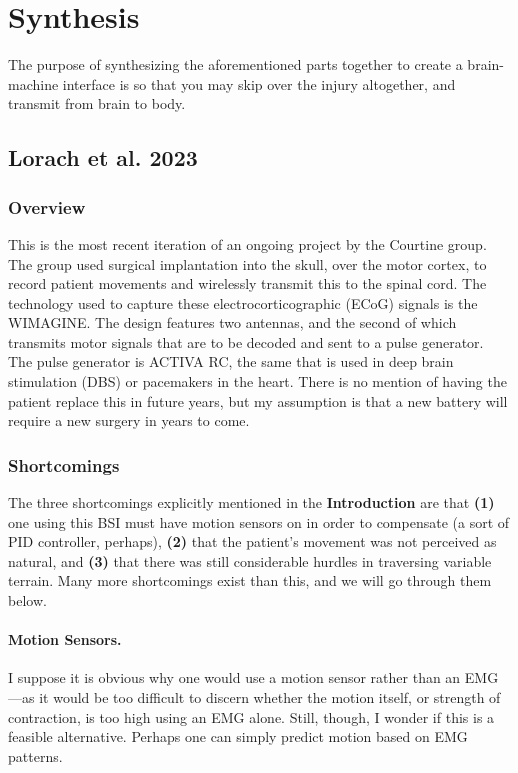 \documentclass[12pt]{report}
\begin{document}
\chapter{Synthesis}

The purpose of synthesizing the aforementioned parts together to create a brain-machine interface is so that you may skip over the injury altogether, and transmit from brain to body. 


\section{Lorach et al. 2023} 
\subsection{Overview} This is the most recent iteration of an ongoing project by the Courtine group. The group used surgical implantation into the skull, over the motor cortex, to record patient movements and wirelessly transmit this to the spinal cord. The technology used to capture these electrocorticographic (ECoG) signals is the WIMAGINE. The design features two antennas, and the second of which transmits motor signals that are to be decoded and sent to a pulse generator. The pulse generator is ACTIVA RC, the same that is used in deep brain stimulation (DBS) or pacemakers in the heart. There is no mention of having the patient replace this in future years, but my assumption is that a new battery will require a new surgery in years to come. 


\subsection{Shortcomings} The three shortcomings explicitly mentioned in the \textbf{Introduction} are that \textbf{(1)} one using this BSI must have motion sensors on in order to compensate (a sort of PID controller, perhaps),  \textbf{(2)} that the patient's movement was not perceived as natural, and \textbf{(3)} that there was still considerable hurdles in traversing variable terrain. Many more shortcomings exist than this, and we will go through them below.

\subsubsection{Motion Sensors.} I suppose it is obvious why one would use a motion sensor rather than an EMG---as it would be too difficult to discern whether the motion itself, or strength of contraction, is too high using an EMG alone. Still, though, I wonder if this is a feasible alternative. Perhaps one can simply predict motion based on EMG patterns.\newline
\end{document}
